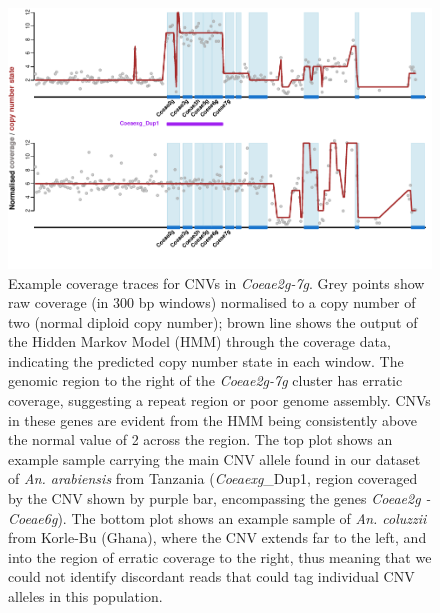 \documentclass[a4paper,12pt]{article}
\begin{document}
\clearpage


\begin{figure}[h]
	\begin{center}
		\includegraphics*[width = 15cm]{../../CNV_analysis/CNV_extra_plots/example_plots_modified.pdf}
		\caption{\footnotesize Example coverage traces for CNVs in \textit{Coeae2g-7g}. Grey points show raw coverage (in 300 bp windows) normalised to a copy number of two (normal diploid copy number); brown line shows the output of the Hidden Markov Model (HMM) through the coverage data, indicating the predicted copy number state in each window. The genomic region to the right of the \textit{Coeae2g-7g} cluster has erratic coverage, suggesting a repeat region or poor genome assembly. CNVs in these genes are evident from the HMM being consistently above the normal value of 2 across the region. The top plot shows an example sample carrying the main CNV allele found in our dataset of \textit{An. arabiensis} from Tanzania (\textit{Coeaexg}\_Dup1, region coveraged by the CNV shown by purple bar, encompassing the genes \textit{Coeae2g - Coeae6g}). The bottom plot shows an example sample of \textit{An. coluzzii} from Korle-Bu (Ghana), where the CNV extends far to the left, and into the region of erratic coverage to the right, thus meaning that we could not identify discordant reads that could tag individual CNV alleles in this population.}
	\end{center}
	\label{FigS7}
\end{figure}
 

\clearpage
\end{document}
